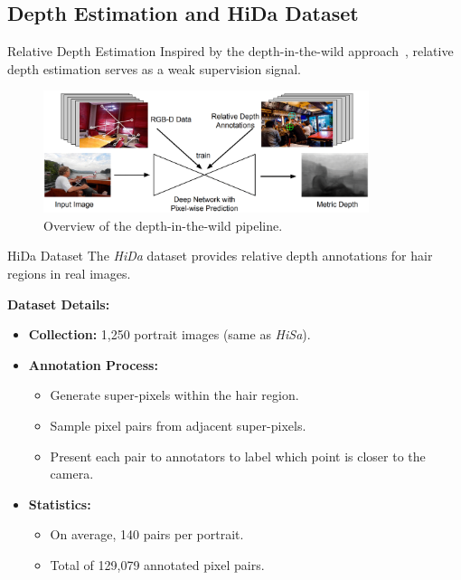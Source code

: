 \subsection{Depth Estimation and HiDa Dataset}

\begin{frame}[t]{Relative Depth Estimation}
    Inspired by the depth-in-the-wild approach~\cite{chen2016single}, relative depth estimation serves as a weak supervision signal.

    \vspace{5pt}

    \begin{figure}[t]
        \centering
        \includegraphics[width=0.85\textwidth]{assets/figures/method/depth/depth-in-the-wild.png}
        \caption{Overview of the depth-in-the-wild pipeline.}
        \label{fig:depth_in_the_wild}
    \end{figure}
\end{frame}

\begin{frame}[t]{HiDa Dataset}
    The \emph{HiDa} dataset provides relative depth annotations for hair regions in real images.

    \vspace{5pt}

    \textbf{Dataset Details:}
    \begin{itemize}
        \item \textbf{Collection:} 1,250 portrait images (same as \emph{HiSa}).
        \item \textbf{Annotation Process:}
        \begin{itemize}
            \item Generate super-pixels within the hair region.
            \item Sample pixel pairs from adjacent super-pixels.
            \item Present each pair to annotators to label which point is closer to the camera.
        \end{itemize}
        \item \textbf{Statistics:}
        \begin{itemize}
            \item On average, 140 pairs per portrait.
            \item Total of 129,079 annotated pixel pairs.
        \end{itemize}
    \end{itemize}
\end{frame}

